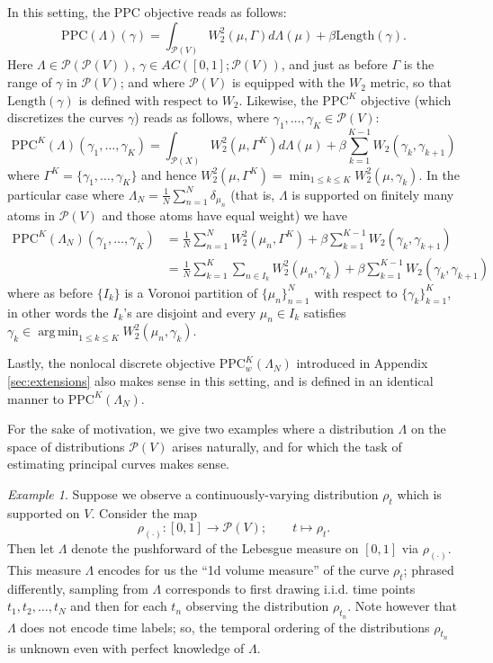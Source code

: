 \documentclass[aos, preprint]{imsart}
\theoremstyle{plain}
\theoremstyle{remark}
\newtheorem{example}{Example}[section]
\DeclareMathOperator*{\argmin}{arg\,min}
\begin{document}
{In this setting, the PPC objective reads as follows:
\[
\text{PPC}(\Lambda)(\gamma)=\int_{\mathcal{P}(V)}W_{2}^{2}(\mu,\Gamma)d\Lambda(\mu)+\beta\text{Length}(\gamma).
\]
Here $\Lambda\in\mathcal{P}(\mathcal{P}(V))$, $\gamma\in AC([0,1];\mathcal{P}(V))$, and just as before $\Gamma$ is the range of $\gamma$ in $\mathcal{P}(V)$; and
where $\mathcal{P}(V)$ is equipped with the $W_{2}$ metric, so that
$\text{Length}(\gamma)$ is  defined with respect to $W_{2}$.
Likewise, the $\text{PPC}^{K}$ objective (which discretizes the curves
$\gamma$) reads as follows, where $\gamma_{1},\ldots,\gamma_{K}\in\mathcal{P}(V)$:
\[
\text{PPC}^{K}(\Lambda)(\gamma_{1},\ldots,\gamma_{K})=\int_{\mathcal{P}(X)}W_{2}^{2}(\mu,\Gamma^{K})d\Lambda(\mu)+\beta\sum_{k=1}^{K-1}W_{2}(\gamma_{k},\gamma_{k+1})
\]
where $\Gamma^{K}=\{\gamma_{1},\ldots,\gamma_{K}\}$ and hence $W_{2}^{2}(\mu,\Gamma^{K})=\min_{1\leq k\leq K}W_{2}^{2}(\mu,\gamma_{k})$.
In the particular case where $\Lambda_{N}=\frac{1}{N}\sum_{n=1}^{N}\delta_{\mu_{n}}$
(that is, $\Lambda$ is supported on finitely many atoms in $\mathcal{P}(V)$
and those atoms have equal weight) we have
\begin{align*}
\text{PPC}^{K}(\Lambda_{N})(\gamma_{1},\ldots,\gamma_{K}) & =\frac{1}{N}\sum_{n=1}^{N}W_{2}^{2}(\mu_{n},\Gamma^{K})+\beta\sum_{k=1}^{K-1}W_{2}(\gamma_{k},\gamma_{k+1})\\
 & =\frac{1}{N}\sum_{k=1}^{K}\sum_{n\in I_{k}}W_{2}^{2}(\mu_{n},\gamma_{k})+\beta\sum_{k=1}^{K-1}W_{2}(\gamma_{k},\gamma_{k+1})
\end{align*}
where as before $\{I_{k}\}$ is a Voronoi partition of $\{\mu_{n}\}_{n=1}^{N}$
with respect to $\{\gamma_{k}\}_{k=1}^{K}$, in other words the $I_{k}$'s
are disjoint and every $\mu_{n}\in I_{k}$ satisfies $\gamma_{k}\in\argmin_{1\leq k\leq K}W_{2}^{2}(\mu_{n},\gamma_{k})$.

Lastly, the nonlocal discrete objective $\text{PPC}_{w}^{K}(\Lambda_{N})$ introduced in Appendix \ref{sec:extensions} also makes sense in this setting, and is defined in an identical manner to $\text{PPC}^K(\Lambda_{N})$.

For the sake of motivation, we give two examples where a distribution $\Lambda$ on the space of distributions $\mathcal{P}(V)$ arises naturally, and for which the task of estimating principal curves makes sense.

\begin{example}

  Suppose we observe a
    continuously-varying distribution $\rho_{t}$ which is supported on $V$.
    Consider the map
  \[
    \rho_{(\cdot)}:[0,1]\rightarrow\mathcal{P}(V);\qquad t\mapsto\rho_{t}.
  \]
  Then let $\Lambda$ denote the pushforward of the Lebesgue measure on
  $[0,1]$ via $\rho_{(\cdot)}$. This measure $\Lambda$ encodes for us
  the ``1d volume measure'' of the curve $\rho_t$; phrased
  differently, sampling from $\Lambda$ corresponds to first drawing
  i.i.d. time points $t_{1},t_{2},\ldots,t_{N}$ and then for each
  $t_{n}$ observing the distribution $\rho_{t_{n}}$. Note however that
  $\Lambda$ does not encode time labels; so, the temporal
  ordering of the distributions $\rho_{t_n}$ is unknown even with
  perfect knowledge of $\Lambda$.
\end{example}

}
\end{document}
